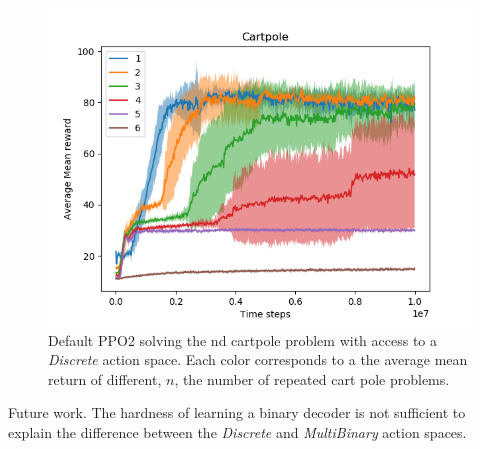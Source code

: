 \begin{figure}[h!]
\centering
\includegraphics[width=1\textwidth,height=0.5\textheight]{../../pictures/figures/discrete-nd-cart.png}
\caption{Default PPO2 solving the nd cartpole problem with access to a \textit{Discrete} action space. Each color corresponds to a the average mean return of different, $n$, the number of repeated cart pole problems.}
\end{figure}






Future work. The hardness of learning a binary decoder is not sufficient to explain the difference between the
\textit{Discrete} and \textit{MultiBinary} action spaces.
